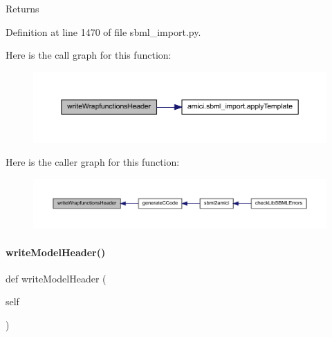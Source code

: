 \begin{DoxyReturn}{Returns}

\end{DoxyReturn}


Definition at line 1470 of file sbml\+\_\+import.\+py.

Here is the call graph for this function\+:
\nopagebreak
\begin{figure}[H]
\begin{center}
\leavevmode
\includegraphics[width=350pt]{classamici_1_1sbml__import_1_1_sbml_importer_ad16157bcd165452e4ff9aa9d6f12b907_cgraph}
\end{center}
\end{figure}
Here is the caller graph for this function\+:
\nopagebreak
\begin{figure}[H]
\begin{center}
\leavevmode
\includegraphics[width=350pt]{classamici_1_1sbml__import_1_1_sbml_importer_ad16157bcd165452e4ff9aa9d6f12b907_icgraph}
\end{center}
\end{figure}
\mbox{\label{classamici_1_1sbml__import_1_1_sbml_importer_aa549fe60f186fefb87b71a2461b0a270}} 
\paragraph{\texorpdfstring{write\+Model\+Header()}{writeModelHeader()}}
{\footnotesize\ttfamily def write\+Model\+Header (\begin{DoxyParamCaption}\item[{}]{self }\end{DoxyParamCaption})}

